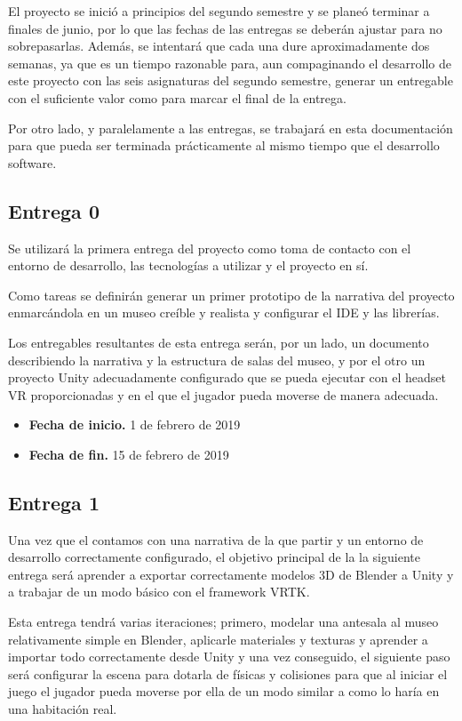 El proyecto se inició a principios del segundo semestre y se planeó terminar a finales de junio, por lo que las fechas de las entregas se deberán ajustar para no sobrepasarlas. Además, se intentará que cada una dure aproximadamente dos semanas, ya que es un tiempo razonable para, aun compaginando el desarrollo de este proyecto con las seis asignaturas del segundo semestre, generar un entregable con el suficiente valor como para marcar el final de la entrega.

Por otro lado, y paralelamente a las entregas, se trabajará en esta documentación para que pueda ser terminada prácticamente al mismo tiempo que el desarrollo software.

\subsection{Entrega 0}

Se utilizará la primera entrega del proyecto como toma de contacto con el entorno de desarrollo, las tecnologías a utilizar y el proyecto en sí.

Como tareas se definirán generar un primer prototipo de la narrativa del proyecto enmarcándola en un museo creíble y realista y configurar el \acs{IDE} y las librerías.

Los entregables resultantes de esta entrega serán, por un lado, un documento describiendo la narrativa y la estructura de salas del museo, y por el otro un proyecto Unity adecuadamente configurado que se pueda ejecutar con el headset \acs{VR} proporcionadas y en el que el jugador pueda moverse de manera adecuada.

\begin{itemize}
    \item \textbf{Fecha de inicio.} 1 de febrero de 2019
    \item \textbf{Fecha de fin.} 15 de febrero de 2019
\end{itemize}

\subsection{Entrega 1}

Una vez que el contamos con una narrativa de la que partir y un entorno de desarrollo correctamente configurado, el objetivo principal de la la siguiente entrega será aprender a exportar correctamente modelos 3D de Blender a Unity y a trabajar de un modo básico con el framework \acs{VRTK}.

Esta entrega tendrá varias iteraciones; primero, modelar una antesala al museo relativamente simple en Blender, aplicarle materiales y texturas y aprender a importar todo correctamente desde Unity y una vez conseguido, el siguiente paso será configurar la escena para dotarla de físicas y colisiones para que al iniciar el juego el jugador pueda moverse por ella de un modo similar a como lo haría en una habitación real.

